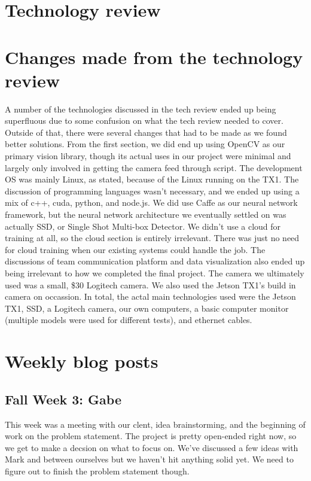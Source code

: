 \documentclass[onecolumn, draftclsnofoot,10pt, compsoc]{IEEEtran}
\begin{document}
\section{Technology review}



\section{Changes made from the technology review}
A number of the technologies discussed in the tech review ended up being superfluous due to some confusion on what the tech review needed to cover.
Outside of that, there were several changes that had to be made as we found better solutions. 
From the first section, we did end up using OpenCV as our primary vision library, though its actual uses in our project were minimal and largely only involved in getting the camera feed through script.
The development OS was mainly Linux, as stated, because of the Linux running on the TX1.
The discussion of programming languages wasn't necessary, and we ended up using a mix of c++, cuda, python, and node.js.
We did use Caffe as our neural network framework,  but the neural network architecture we eventually settled on was actually SSD, or Single Shot Multi-box Detector.
We didn't use a cloud for training at all, so the cloud section is entirely irrelevant.
There was just no need for cloud training when our existing systems could handle the job.
The discussions of team communication platform and data visualization also ended up being irrelevant to how we completed the final project. 
The camera we ultimately used was a small, \$30 Logitech camera. 
We also used the Jetson TX1's build in camera on occassion. 
In total, the actal main technologies used were the Jetson TX1, SSD, a Logitech camera, our own computers, a basic computer monitor (multiple models were used for different tests), and ethernet cables.

\section{Weekly blog posts}
\subsection{Fall Week 3: Gabe}
This week was a meeting with our clent, idea brainstorming, and the beginning of work on the problem statement. The project is pretty open-ended right now, so we get to make a decsion on what to focus on. We've discussed a few ideas with Mark and between ourselves but we haven't hit anything solid yet. We need to figure out to finish the problem statement though.
\end{document}
